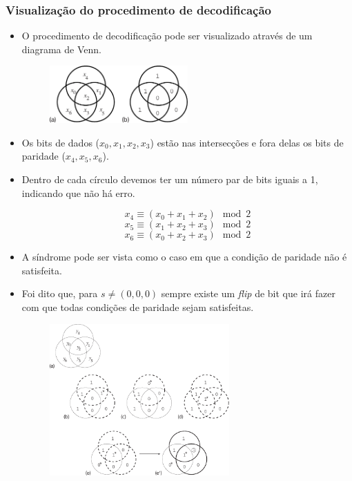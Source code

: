 \begin{frame}[allowframebreaks]
  \frametitle{Visualização do procedimento de decodificação}
  \begin{itemize}
  \item O procedimento de decodificação pode ser visualizado através de um diagrama de Venn.
                \begin{figure}[h!]
                \centering
                \includegraphics[width=0.5\textwidth]{images/venhamm.pdf}
                \label{fig:venhamm}
                \end{figure}

  \item Os bits de dados ($x_0,x_1,x_2,x_3$) estão nas intersecções e fora delas os bits de paridade ($x_4,x_5,x_6$).
  \item Dentro de cada círculo devemos ter um número par de bits iguais a 1, indicando que não há erro.

 	\begin{equation}
	x_4 \equiv ( x_0 + x_1 + x_2 ) \mod 2
	\end{equation}
        \begin{equation}
        x_5 \equiv ( x_1 + x_2 + x_3 ) \mod 2
        \end{equation}
        \begin{equation}
        x_6 \equiv ( x_0 + x_2 + x_3 ) \mod 2
        \end{equation}
  \item A síndrome pode ser vista como o caso em que a condição de paridade não é satisfeita.
  \item Foi dito que, para $s \neq (0,0,0)$ sempre existe um \textit{flip} de bit que irá fazer com que todas condições de paridade 
	sejam satisfeitas.

                \begin{figure}[h!]
                \centering
                \includegraphics[width=0.65\textwidth]{images/venhamm2.pdf}
                \label{fig:venhamm2}
                \end{figure}


\end{itemize}
\end{frame}
